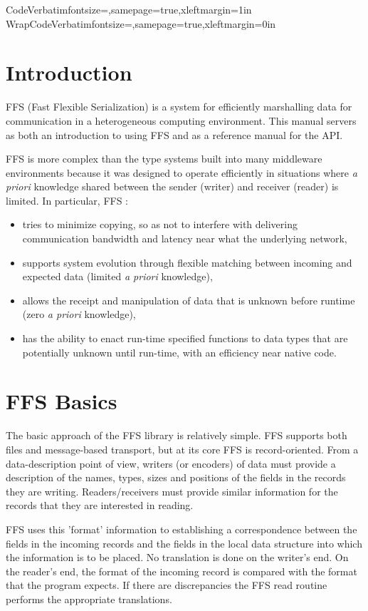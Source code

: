 \DefineVerbatimEnvironment%
{Code}{Verbatim}{fontsize=\small,samepage=true,xleftmargin=1in}
\DefineVerbatimEnvironment%
{WrapCode}{Verbatim}{fontsize=\small,samepage=true,xleftmargin=0in}
\section{Introduction}

FFS (Fast Flexible Serialization) is a system for efficiently marshalling
data for communication in a heterogeneous computing environment.  This
manual servers as both an introduction to using FFS and as a reference
manual for the API.

FFS is more complex than the type systems built into many middleware
environments because it was designed to operate efficiently in situations
where {\it a priori} knowledge shared between the sender (writer) and
receiver (reader) is limited.  In particular, FFS :
\begin{itemize}
\item tries to minimize copying, so as not to interfere with
  delivering communication bandwidth and latency near what the underlying
  network,
\item supports system evolution through flexible matching between incoming
  and expected data (limited {\it a priori} knowledge),
\item allows the receipt and manipulation of data that is unknown before
  runtime (zero {\it a priori} knowledge),
\item has the ability to enact run-time specified functions to data types that
  are potentially unknown until run-time, with an efficiency near native code.
\end{itemize}

\section{FFS Basics}

The basic approach of the FFS library is relatively simple.  FFS supports
both files and message-based transport, but at its core FFS is
record-oriented.  From a data-description point of view, writers (or
encoders) of data must provide a description of the names, types, sizes and
positions of the fields in the records they are writing.  Readers/receivers must
provide similar information for the records that they are interested in
reading.

FFS uses this 'format' information to establishing a correspondence between
the fields in the incoming records and the fields in the local data
structure into which the information is to be placed.  No translation is
done on the writer's end.  On the reader's end, the format of the incoming
record is compared with the format that the program expects.  If there are
discrepancies the FFS read routine performs the appropriate translations.


